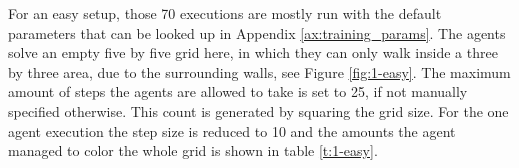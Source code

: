 For an easy setup, those 70 executions are mostly run with the default parameters that can be looked up in Appendix \ref{ax:training_params}. The agents solve an empty five by five grid here, in which they can only walk inside a three by three area, due to the surrounding walls, see Figure \ref{fig:1-easy}. The maximum amount of steps the agents are allowed to take is set to 25, if not manually specified otherwise. This count is generated by squaring the grid size. For the one agent execution the step size is reduced to 10 and the amounts the agent managed to color the whole grid is shown in table \ref{t:1-easy}.



